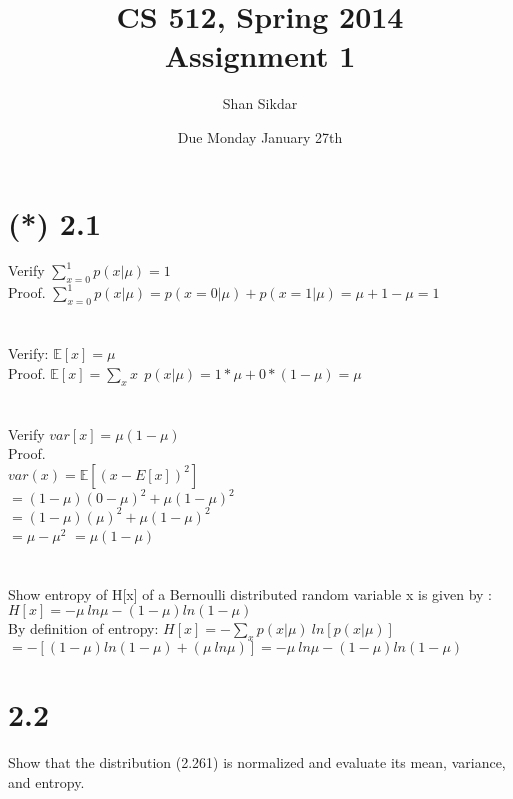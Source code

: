 \documentclass[11pt,leqno,fleqn]{article}
\title{CS 512, Spring 2014
       \\[1ex]
       \textbf{Assignment 1}}
\author{Shan Sikdar}
\date{Due Monday January 27th} %
\begin{document}
\maketitle

\section{(*) 2.1 }
Verify $ \sum\limits_{x=0}^1 p(x | \mu) =1 $ \\
Proof.  $  \sum\limits_{x=0}^1 p(x | \mu) = p( x = 0 | \mu) + p( x= 1 | \mu) =  \mu + 1 - \mu = 1 $\\
\\
\\
Verify: $\mathbb{E}[x] = \mu$\\
Proof.   $\mathbb{E}[x] =  \sum\limits_{x} x \ \  p(x | \mu)  = 1* \mu + 0*(1 - \mu) = \mu$\\
\\
\\
Verify $var[x] = \mu (1 - \mu) $\\
Proof.  \\
$var(x) = \mathbb{E}[(x - E[x])^2]$\\
$= (1 - \mu )(0 - \mu)^2  + \mu (1 - \mu)^2$\\
$= (1 - \mu )(\mu)^2  + \mu (1 - \mu)^2$\\
$ = \mu - \mu^2 $ $ = \mu(1-\mu)$\\
\\
\\
Show entropy of H[x] of a Bernoulli distributed random variable x is given by : $H[x] = - \mu \  ln \mu - ( 1- \mu) ln(1-\mu)$\\
By definition of entropy: $ H[x] = - \sum\limits_{x} p(x | \mu)  \ ln[p(x | \mu)]  $\\
$= -[ (1 - \mu) ln(1-\mu) + (\mu \ ln \mu)]  =  - \mu \  ln \mu - ( 1- \mu) ln(1-\mu)$

\section{ 2.2} Show that the distribution (2.261) is normalized and evaluate its mean, variance, and entropy.\\
 
\end{document}
